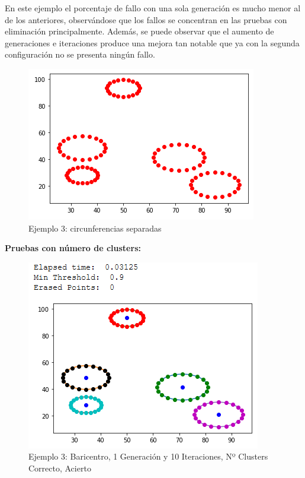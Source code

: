 \documentclass[conference,a4paper]{IEEEtran}
\begin{document}
En este ejemplo el porcentaje de fallo con una sola generación es mucho menor al de los anteriores, observándose que los fallos se concentran en las pruebas con eliminación principalmente. Además, se puede observar que el aumento de generaciones e iteraciones produce una mejora tan notable que ya con la segunda configuración no se presenta ningún fallo.

\begin{figure}[H]
\centering
\includegraphics[scale=0.65]{Experimentacion/Ejemplo3/Ejemplo3}
\caption{Ejemplo 3: circunferencias separadas}
\end{figure}

\clearpage
\textbf{Pruebas con número de clusters:}\\

\begin{figure}[H]
\centering
\includegraphics[scale=0.65]{Experimentacion/Ejemplo3/ej3_b_1_10_cc_correct}
\caption{Ejemplo 3: Baricentro, 1 Generación y 10 Iteraciones,  Nº Clusters Correcto, Acierto\\}
\end{figure}
\end{document}

